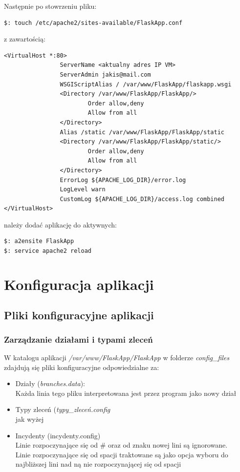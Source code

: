 \documentclass[12pt,a4paper]{article}
\begin{document}
Następnie po stowrzeniu pliku:
\begin{lstlisting}
$: touch /etc/apache2/sites-available/FlaskApp.conf
\end{lstlisting}

z zawartością:
\begin{lstlisting}
<VirtualHost *:80>
                ServerName <aktualny adres IP VM>
                ServerAdmin jakis@mail.com
                WSGIScriptAlias / /var/www/FlaskApp/flaskapp.wsgi
                <Directory /var/www/FlaskApp/FlaskApp/>
                        Order allow,deny
                        Allow from all
                </Directory>
                Alias /static /var/www/FlaskApp/FlaskApp/static
                <Directory /var/www/FlaskApp/FlaskApp/static/>
                        Order allow,deny
                        Allow from all
                </Directory>
                ErrorLog ${APACHE_LOG_DIR}/error.log
                LogLevel warn
                CustomLog ${APACHE_LOG_DIR}/access.log combined
</VirtualHost>
\end{lstlisting}     
 
należy dodać aplikację do aktywnych: 
\begin{lstlisting}
$: a2ensite FlaskApp
$: service apache2 reload
\end{lstlisting}
\newpage
\section{Konfiguracja aplikacji}
\subsection{Pliki konfiguracyjne aplikacji}
\subsubsection{Zarządzanie działami i typami zleceń}
\quad
W katalogu aplikacji \textit{/var/www/FlaskApp/FlaskApp}  w folderze \textit{config\_files} zdajdują się pliki konfiguracyjne odpowiedzialne za:
\begin{itemize}
\item Działy (\textit{branches.data}):\\
Każda linia tego pliku interpretowana jest przez program jako nowy dział
\item Typy zleceń (\textit{typy\_zleceń.config}\\
jak wyżej
\item Incydenty (incydenty.config)\\
Linie rozpoczynające się od \# oraz od znaku nowej lini są ignorowane.\\
Linie rozpoczynające się od spacji traktowane są jako opcja wyboru do najbliższej lini nad ną nie rozpoczynającej się od spacji
\end{itemize}
\end{document}
